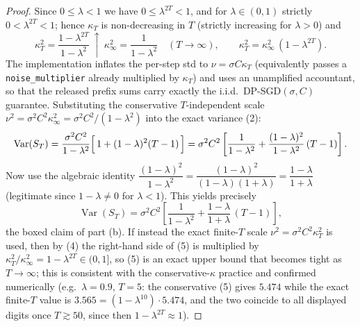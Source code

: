\begin{proof}
Since $0\le\lambda<1$ we have $0\le\lambda^{2T}<1$, and for $\lambda\in(0,1)$ strictly $0<\lambda^{2T}<1$; hence $\kappa_T$ is non-decreasing in $T$ (strictly increasing for $\lambda>0$) and
\[
\kappa_T^2=\frac{1-\lambda^{2T}}{1-\lambda^2}\ \uparrow\ \kappa_\infty^2=\frac{1}{1-\lambda^2}\quad(T\to\infty),
\qquad \kappa_T^2=\kappa_\infty^2\,(1-\lambda^{2T}).
\tag{4}
\]
The implementation inflates the per-step std to $\nu=\sigma C\kappa_T$ (equivalently passes a \texttt{noise\_multiplier} already multiplied by $\kappa_T$) and uses an unamplified accountant, so that the released prefix sums carry exactly the i.i.d.\ DP-SGD$(\sigma,C)$ guarantee. Substituting the conservative $T$-independent scale $\nu^2=\sigma^2C^2\kappa_\infty^2=\sigma^2C^2/(1-\lambda^2)$ into the exact variance (2):
\[
\operatorname{Var}(S_T)
=\frac{\sigma^2C^2}{1-\lambda^2}\Bigl[\,1+(1-\lambda)^2(T-1)\,\Bigr]
=\sigma^2C^2\left[\frac{1}{1-\lambda^2}+\frac{(1-\lambda)^2}{1-\lambda^2}\,(T-1)\right].
\]
Now use the algebraic identity $\dfrac{(1-\lambda)^2}{1-\lambda^2}=\dfrac{(1-\lambda)^2}{(1-\lambda)(1+\lambda)}=\dfrac{1-\lambda}{1+\lambda}$ (legitimate since $1-\lambda\ne0$ for $\lambda<1$). This yields precisely
\[
\operatorname{Var}(S_T)=\sigma^2C^2\left[\frac{1}{1-\lambda^2}+\frac{1-\lambda}{1+\lambda}\,(T-1)\right],
\tag{5}
\]
the boxed claim of part (b). If instead the exact finite-$T$ scale $\nu^2=\sigma^2C^2\kappa_T^2$ is used, then by (4) the right-hand side of (5) is multiplied by $\kappa_T^2/\kappa_\infty^2=1-\lambda^{2T}\in(0,1]$, so (5) is an exact upper bound that becomes tight as $T\to\infty$; this is consistent with the conservative-$\kappa$ practice and confirmed numerically (e.g.\ $\lambda=0.9$, $T=5$: the conservative (5) gives $5.474$ while the exact finite-$T$ value is $3.565=(1-\lambda^{10})\cdot 5.474$, and the two coincide to all displayed digits once $T\gtrsim 50$, since then $1-\lambda^{2T}\approx1$).


\end{proof}
